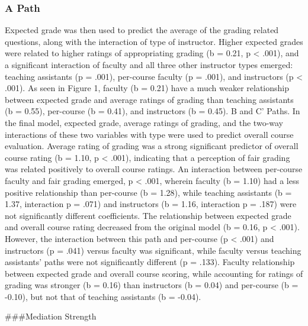 \documentclass[man]{apa6}
\theoremstyle{definition}
\theoremstyle{definition}
\theoremstyle{definition}
\theoremstyle{remark}
\begin{document}
\hypertarget{a-path}{%
\subsubsection{A Path}\label{a-path}}

Expected grade was then used to predict the average of the grading
related questions, along with the interaction of type of instructor.
Higher expected grades were related to higher ratings of appropriating
grading (b = 0.21, p \textless{} .001), and a significant interaction of
faculty and all three other instructor types emerged: teaching
assistants (p = .001), per-course faculty (p = .001), and instructors (p
\textless{} .001). As seen in Figure 1, faculty (b = 0.21) have a much
weaker relationship between expected grade and average ratings of
grading than teaching assistants (b = 0.55), per-course (b = 0.41), and
instructors (b = 0.45). B and C' Paths. In the final model, expected
grade, average ratings of grading, and the two-way interactions of these
two variables with type were used to predict overall course evaluation.
Average rating of grading was a strong significant predictor of overall
course rating (b = 1.10, p \textless{} .001), indicating that a
perception of fair grading was related positively to overall course
ratings. An interaction between per-course faculty and fair grading
emerged, p \textless{} .001, wherein faculty (b = 1.10) had a less
positive relationship than per-course (b = 1.28), while teaching
assistants (b = 1.37, interaction p = .071) and instructors (b = 1.16,
interaction p = .187) were not significantly different coefficients. The
relationship between expected grade and overall course rating decreased
from the original model (b = 0.16, p \textless{} .001). However, the
interaction between this path and per-course (p \textless{} .001) and
instructors (p = .041) versus faculty was significant, while faculty
versus teaching assistants' paths were not significantly different (p =
.133). Faculty relationship between expected grade and overall course
scoring, while accounting for ratings of grading was stronger (b = 0.16)
than instructors (b = 0.04) and per-course (b = -0.10), but not that of
teaching assistants (b = -0.04).

\#\#\#Mediation Strength
\end{document}
